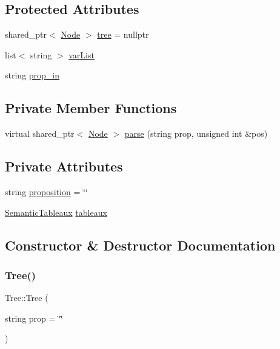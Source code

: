 \subsection*{Protected Attributes}
\begin{DoxyCompactItemize}
\item 
shared\+\_\+ptr$<$ \hyperlink{class_node}{Node} $>$ \hyperlink{class_tree_a9c0875a8767528453814b8e3daf8f9af}{tree} = nullptr
\item 
list$<$ string $>$ \hyperlink{class_tree_a38bca58f3aef44e939f69f092037af50}{var\+List}
\item 
string \hyperlink{class_tree_a2a8e8236ffc2a6ba0ba580f4f0b01128}{prop\+\_\+in}
\end{DoxyCompactItemize}
\subsection*{Private Member Functions}
\begin{DoxyCompactItemize}
\item 
virtual shared\+\_\+ptr$<$ \hyperlink{class_node}{Node} $>$ \hyperlink{class_tree_ad05978c3b3aaa0eefed672a5129c00a1}{parse} (string prop, unsigned int \&pos)
\end{DoxyCompactItemize}
\subsection*{Private Attributes}
\begin{DoxyCompactItemize}
\item 
string \hyperlink{class_tree_a43a26e394162774b0e0614e6567f5fe1}{proposition} = \char`\"{}\char`\"{}
\item 
\hyperlink{class_semantic_tableaux}{Semantic\+Tableaux} \hyperlink{class_tree_ae9dd5a4ebbf36cd6a952c78139221cad}{tableaux}
\end{DoxyCompactItemize}


\subsection{Constructor \& Destructor Documentation}
\mbox{\label{class_tree_a114a18872bc2535a73ceb0719cde7945}} 
\subsubsection{\texorpdfstring{Tree()}{Tree()}\hspace{0.1cm}{\footnotesize\ttfamily [1/2]}}
{\footnotesize\ttfamily Tree\+::\+Tree (\begin{DoxyParamCaption}\item[{string}]{prop = {\ttfamily \char`\"{}\char`\"{}} }\end{DoxyParamCaption})\hspace{0.3cm}{\ttfamily [explicit]}}

